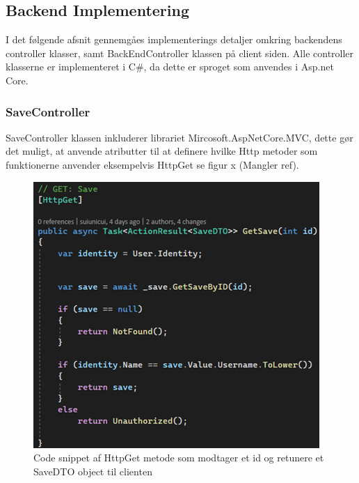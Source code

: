 \subsection{Backend Implementering}

I det følgende afsnit gennemgåes implementerings detaljer omkring backendens controller klasser, samt BackEndController klassen på client siden. Alle controller klasserne er implementeret i C\#, da dette er sproget som anvendes i Asp.net Core. \\

\subsubsection{SaveController}
SaveController klassen inkluderer librariet Mircosoft.AspNetCore.MVC, dette gør det muligt, at anvende atributter til at definere hvilke Http metoder som funktionerne anvender eksempelvis HttpGet se figur x (Mangler ref).\\


\begin{figure}[H]
\centering
\includegraphics[width = \textwidth]{02-Body/Images/Backend_Code_GetSave.PNG}
\caption{Code snippet af HttpGet metode som modtager et id og retunere et SaveDTO object til clienten}
\label{fig:Arkitektur-Backend-Code-GetSave}
\end{figure}

